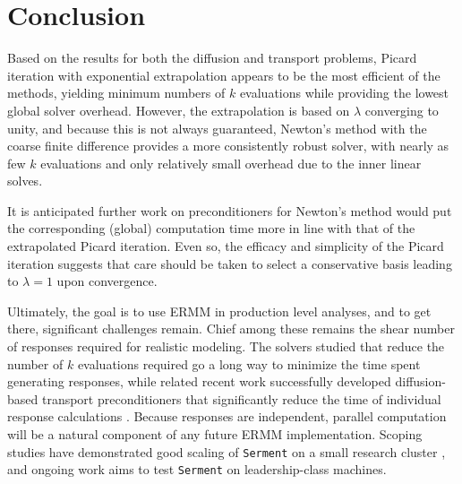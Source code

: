 \section{Conclusion}
\label{sec:conclusion}

Based on the results for both the diffusion and transport problems, Picard 
iteration with exponential extrapolation appears to be the most
efficient of the methods, yielding minimum numbers of $k$ evaluations 
while providing the lowest global solver overhead.  However, the 
extrapolation is based on $\lambda$ converging to unity, and because this 
is not always guaranteed, Newton's method with the coarse finite difference 
provides a more consistently robust solver, with nearly as 
few $k$ evaluations and only relatively small overhead due to the 
inner linear solves.

It is anticipated further work on preconditioners for Newton's method 
would put the corresponding (global) computation time more in line with 
that of the extrapolated Picard iteration.  Even so, the efficacy and 
simplicity of the Picard iteration suggests that care should be taken to 
select a conservative basis leading to $\lambda = 1$ upon convergence.

Ultimately, the goal is to use ERMM in production level analyses, 
and to get there, significant challenges remain.  Chief among these 
remains the shear number of responses required for realistic 
modeling.  The solvers studied that reduce the number of $k$ evaluations 
required go a long way to minimize the time spent generating  
responses, while  
related recent work successfully developed diffusion-based 
transport preconditioners that significantly reduce the time of 
individual response calculations \cite{roberts2014dpm}.  Because 
responses are independent, parallel computation will be a natural 
component of 
any future ERMM implementation.  Scoping studies have demonstrated 
good scaling of {\tt Serment} on a small research 
cluster \cite{roberts2014arm}, and ongoing work aims to test {\tt Serment} on 
leadership-class machines.
